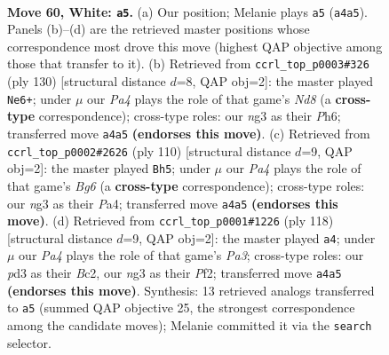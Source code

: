 \documentclass[11pt]{article}
\begin{document}
\clearpage

\begin{figure}[p]\centering
\begin{subfigure}{0.46\textwidth}\centering
\resizebox{\linewidth}{!}{%
\newchessgame
\chessboard[
  setfen={8/kb6/8/8/PP4N1/3p2n1/8/1K6 w - - 0 60},
  showmover=false,
  pgfstyle=straightmove, color=movearrow, markmove={a4-a5}
]}
\caption{}
\end{subfigure}\hfill
\begin{subfigure}{0.46\textwidth}\centering
\resizebox{\linewidth}{!}{%
\newchessgame
\chessboard[
  setfen={3N4/8/p5bP/P1K3k1/8/8/8/8 w - - 3 66},
  showmover=false,
  pgfstyle=straightmove, color=movearrow, markmove={d8-e6}
]}
\caption{}
\end{subfigure}
\\[4pt]
\begin{subfigure}{0.46\textwidth}\centering
\resizebox{\linewidth}{!}{%
\newchessgame
\chessboard[
  setfen={8/3k4/1K1b2B1/8/P7/7p/8/8 w - - 16 56},
  showmover=false,
  pgfstyle=straightmove, color=movearrow, markmove={g6-h5}
]}
\caption{}
\end{subfigure}\hfill
\begin{subfigure}{0.46\textwidth}\centering
\resizebox{\linewidth}{!}{%
\newchessgame
\chessboard[
  setfen={8/p7/3kn3/8/2K5/P7/2B2P2/8 w - - 26 60},
  showmover=false,
  pgfstyle=straightmove, color=movearrow, markmove={a3-a4}
]}
\caption{}
\end{subfigure}
\caption{\textbf{Move 60, White: \texttt{a5}.} (a) Our position; Melanie plays \texttt{a5} (\texttt{a4a5}). Panels (b)--(d) are the retrieved master positions whose correspondence most drove this move (highest QAP objective among those that transfer to it). (b) Retrieved from \texttt{ccrl\_top\_p0003\#326} (ply 130) [structural distance $d$=8, QAP obj=2]: the master played \texttt{Ne6+}; under $\mu$ our \emph{Pa4} plays the role of that game's \emph{Nd8} (a \textbf{cross-type} correspondence); cross-type roles: our \emph{n}g3 as their \emph{P}h6; transferred move \texttt{a4a5} \textbf{(endorses this move)}. (c) Retrieved from \texttt{ccrl\_top\_p0002\#2626} (ply 110) [structural distance $d$=9, QAP obj=2]: the master played \texttt{Bh5}; under $\mu$ our \emph{Pa4} plays the role of that game's \emph{Bg6} (a \textbf{cross-type} correspondence); cross-type roles: our \emph{n}g3 as their \emph{P}a4; transferred move \texttt{a4a5} \textbf{(endorses this move)}. (d) Retrieved from \texttt{ccrl\_top\_p0001\#1226} (ply 118) [structural distance $d$=9, QAP obj=2]: the master played \texttt{a4}; under $\mu$ our \emph{Pa4} plays the role of that game's \emph{Pa3}; cross-type roles: our \emph{p}d3 as their \emph{B}c2, our \emph{n}g3 as their \emph{P}f2; transferred move \texttt{a4a5} \textbf{(endorses this move)}. Synthesis: 13 retrieved analogs transferred to \texttt{a5} (summed QAP objective 25, the strongest correspondence among the candidate moves); Melanie committed it via the \texttt{search} selector.}
\label{fig:thought-m118}
\end{figure}
\end{document}
